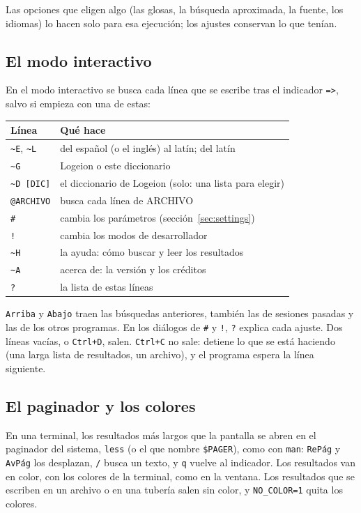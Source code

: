 \documentclass[12pt,
              article,
              oneside
              ]{memoir}
\newcommand*{\key}[1]{\texttt{#1}}
\newcommand*{\tl}{\textasciitilde}
\begin{document}
\noindent
Las opciones que eligen algo (las glosas, la búsqueda aproximada, la
fuente, los idiomas) lo hacen solo para esa ejecución; los ajustes
conservan lo que tenían.

\subsection{El modo interactivo}

%
En el modo interactivo se busca cada línea que se escribe tras el
indicador \texttt{=>}, salvo si empieza con una de estas:

\begin{longtable}{@{}>{\raggedright}p{}p{}@{}}
\toprule
Línea & Qué hace\\
\midrule
\endhead
\texttt{\tl E}, \texttt{\tl L} & del español (o el inglés) al latín; del latín\\
\texttt{\tl G} & Logeion o este diccionario\\
\texttt{\tl D [DIC]} & el diccionario de Logeion (solo: una lista para elegir)\\
\texttt{@ARCHIVO} & busca cada línea de ARCHIVO\\
\texttt{\#} & cambia los parámetros (sección~\ref{sec:settings})\\
\texttt{!} & cambia los modos de desarrollador\\
\texttt{\tl H} & la ayuda: cómo buscar y leer los resultados\\
\texttt{\tl A} & acerca de: la versión y los créditos\\
\texttt{?} & la lista de estas líneas\\
\bottomrule
\end{longtable}

\noindent{}%
\key{Arriba} y \key{Abajo} traen las búsquedas anteriores, también las de
sesiones pasadas y las de los otros programas. En los diálogos de
\texttt{\#} y \texttt{!}, \texttt{?} explica cada ajuste. Dos líneas
vacías, o \key{Ctrl+D}, salen. \key{Ctrl+C} no sale: detiene lo que se
está haciendo (una larga lista de resultados, un archivo), y el programa
espera la línea siguiente.

\subsection{El paginador y los colores}

%
En una terminal, los resultados más largos que la pantalla se abren en el
paginador del sistema, \texttt{less} (o el que nombre \texttt{\$PAGER}),
como con \texttt{man}: \key{RePág} y \key{AvPág} los desplazan,
\texttt{/} busca un texto, y \texttt{q} vuelve al indicador. Los
resultados van en color, con los colores de la terminal, como en la
ventana. Los resultados que se escriben en un archivo o en una tubería
salen sin color, y \texttt{NO\_COLOR=1} quita los colores.
\end{document}
